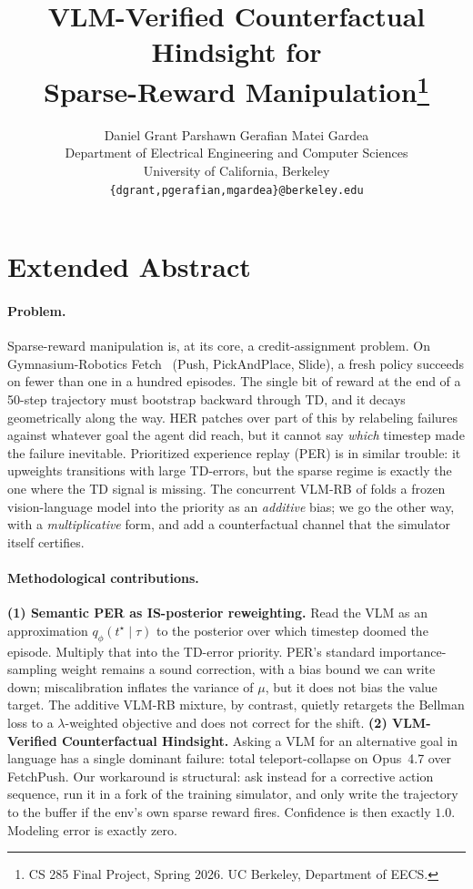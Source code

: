\documentclass{article}
\title{VLM-Verified Counterfactual Hindsight for\\Sparse-Reward Manipulation\thanks{CS 285 Final Project, Spring 2026. UC Berkeley, Department of EECS.}}
\author{%
  Daniel Grant \quad Parshawn Gerafian \quad Matei Gardea \\
  Department of Electrical Engineering and Computer Sciences \\
  University of California, Berkeley \\
  \texttt{\{dgrant,pgerafian,mgardea\}@berkeley.edu}
}
\begin{document}
\maketitle

\section*{Extended Abstract}
\label{sec:extended-abstract}

\paragraph{Problem.}
Sparse-reward manipulation is, at its core, a credit-assignment
problem. On Gymnasium-Robotics Fetch~\citep{delazcano2024gymrobotics}
(Push, PickAndPlace, Slide), a fresh policy succeeds on fewer
than one in a hundred episodes. The single bit of reward at the end
of a 50-step trajectory must bootstrap backward through TD, and it
decays geometrically along the way. HER patches over part of this by
relabeling failures against whatever goal the agent did reach, but
it cannot say \emph{which} timestep made the failure inevitable.
Prioritized experience replay (PER) is in similar trouble: it
upweights transitions with large TD-errors, but the sparse regime is
exactly the one where the TD signal is missing. The concurrent
VLM-RB of \citet{sharony2026vlmrb} folds a frozen vision-language
model into the priority as an \emph{additive} bias; we go the other
way, with a \emph{multiplicative} form, and add a counterfactual
channel that the simulator itself certifies.

\paragraph{Methodological contributions.}
\textbf{(1) Semantic PER as IS-posterior reweighting.}
Read the VLM as an approximation $q_\phi(t^\star\!\mid\!\tau)$ to the
posterior over which timestep doomed the episode. Multiply that into
the TD-error priority. PER's standard importance-sampling weight remains
a sound correction, with a bias bound we can write down; miscalibration
inflates the variance of $\mu$, but it does not bias the value target.
The additive VLM-RB mixture, by contrast, quietly retargets the Bellman
loss to a $\lambda$-weighted objective and does not correct for the
shift.
\textbf{(2) VLM-Verified Counterfactual Hindsight.}
Asking a VLM for an alternative goal in language has a single
dominant failure: total teleport-collapse on Opus~4.7 over FetchPush.
Our workaround is structural: ask instead for a corrective action
sequence, run it in a fork of the training simulator, and only write
the trajectory to the buffer if the env's own sparse reward fires.
Confidence is then exactly $1.0$. Modeling error is exactly zero.
\end{document}
